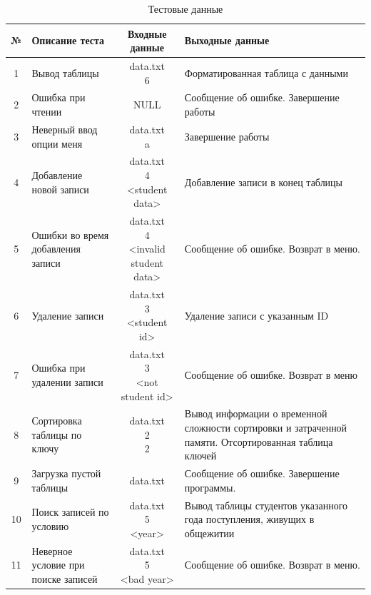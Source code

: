 \begin{table}
	\caption{Тестовые данные}
	\begin{center}
		\begin{tabular}{|c|m{8em}|c|m{12em}|}
			\hline
			№ & Описание теста & Входные данные & Выходные данные \\
			\hline
			1 & Вывод таблицы & \specialcell{data.txt \\ 6} & Форматированная таблица с данными \\
			\hline
			2 & Ошибка при чтении & NULL & Сообщение об ошибке. Завершение работы \\
			\hline
			3 & Неверный ввод опции меня & \specialcell{data.txt \\ a} & Завершение работы \\
			\hline
			4 & Добавление новой записи & \specialcell{data.txt \\ 4 \\<student data>} & Добавление записи в конец таблицы \\
			\hline
			5 & Ошибки во время добавления записи & \specialcell{data.txt \\ 4 \\ <invalid student data>} & Сообщение об ошибке. Возврат в меню.  \\
			\hline
			6 & Удаление записи & \specialcell{data.txt \\ 3 \\ <student id>} & Удаление записи с указанным ID \\
			\hline
			7 & Ошибка при удалении записи & \specialcell{data.txt \\ 3 \\ <not student id>} & Сообщение об ошибке. Возврат в меню \\
			\hline
			8 & Сортировка таблицы по ключу & \specialcell{data.txt \\ 2 \\ 2} & Вывод информации о временной сложности сортировки и затраченной памяти. Отсортированная таблица ключей \\
			\hline
			9 & Загрузка пустой таблицы & data.txt & Сообщение об ошибке. Завершение программы. \\
			\hline
			10 & Поиск записей по условию & \specialcell{data.txt \\ 5 \\ <year>} & Вывод таблицы студентов указанного года поступления, живущих в общежитии \\
			\hline
			11 & Неверное условие при поиске записей & \specialcell{data.txt \\ 5 \\ <bad year>} & Сообщение об ошибке. Возврат в меню.\\
			\hline
		\end{tabular}
	\end{center}
\end{table}


